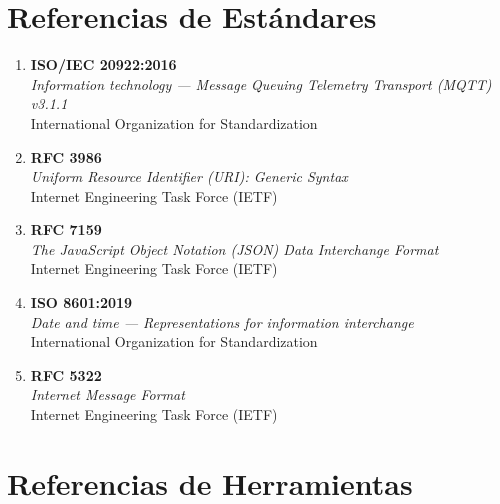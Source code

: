 \section{Referencias de Estándares}

\begin{enumerate}

    \item \textbf{ISO/IEC 20922:2016} \\
    \textit{Information technology — Message Queuing Telemetry Transport (MQTT) v3.1.1} \\
    International Organization for Standardization

    \item \textbf{RFC 3986} \\
    \textit{Uniform Resource Identifier (URI): Generic Syntax} \\
    Internet Engineering Task Force (IETF)

    \item \textbf{RFC 7159} \\
    \textit{The JavaScript Object Notation (JSON) Data Interchange Format} \\
    Internet Engineering Task Force (IETF)

    \item \textbf{ISO 8601:2019} \\
    \textit{Date and time — Representations for information interchange} \\
    International Organization for Standardization

    \item \textbf{RFC 5322} \\
    \textit{Internet Message Format} \\
    Internet Engineering Task Force (IETF)

\end{enumerate}

\section{Referencias de Herramientas}

